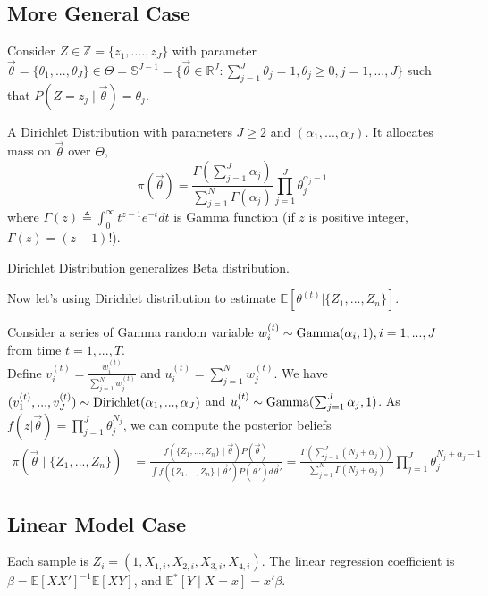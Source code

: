 \documentclass[11pt]{elegantbook}
\begin{document}
\subsection{More General Case}
Consider $Z\in \mathbb{Z}=\{z_1,....,z_J\}$ with parameter $\vec{\theta}=\{\theta_1,...,\theta_J\}\in \Theta= \mathbb{S}^{J-1}=\{\vec{\theta}\in \mathbb{R}^J:\sum_{j=1}^J\theta_j=1,\theta_j\geq 0, j=1,...,J\}$ such that $P(Z=z_j\mid\vec{\theta})=\theta_j$.
\begin{definition}
    \normalfont
    A Dirichlet Distribution with parameters $J\geq 2$ and $(\alpha_1,...,\alpha_J)$.
    It allocates mass on $\vec{\theta}$ over $\Theta$,
    $$\pi(\vec{\theta})=\frac{\Gamma(\sum_{j=1}^J \alpha_j)}{\sum_{j=1}^N\Gamma(\alpha_j)}\prod_{j=1}^J\theta_j^{\alpha_j-1}$$
    where $\Gamma(z)\triangleq\int_0^\infty t^{z-1}e^{-t}dt$ is Gamma function (if $z$ is positive integer, $\Gamma(z)=(z-1)!$).
\end{definition}
\begin{note}
    Dirichlet Distribution generalizes Beta distribution.
\end{note}

Now let's using Dirichlet distribution to estimate $\mathbb{E}[\theta^{(t)}|\{Z_1,...,Z_n\}]$.

Consider a series of Gamma random variable $w_i^{(t)}\sim \textnormal{Gamma}(\alpha_i,1), i=1,...,J$ from time $t=1,...,T$.\\
Define $v_i^{(t)}=\frac{w_i^{(t)}}{\sum_{j=1}^N w_j^{(t)}}$ and $u_i^{(t)}=\sum_{j=1}^N w_j^{(t)}$. We have $(v_1^{(t)},...,v_J^{(t)})\sim \textnormal{Dirichlet}(\alpha_1,...,\alpha_J)$ and $u_i^{(t)}\sim \textnormal{Gamma}(\sum_{j=1}^J\alpha_j,1)$. As $f(z|\vec{\theta})=\prod_{j=1}^J\theta_j^{N_j}$, we can compute the posterior beliefs
\begin{equation}
    \begin{aligned}
        \pi(\vec{\theta}\mid \{Z_1,...,Z_n\})&=\frac{f(\{Z_1,...,Z_n\}\mid \vec{\theta})P(\vec{\theta})}{\int f(\{Z_1,...,Z_n\}\mid \vec{\theta}')P(\vec{\theta}')d\vec{\theta}'}=\frac{\Gamma(\sum_{j=1}^J (N_j+\alpha_j))}{\sum_{j=1}^N\Gamma(N_j+\alpha_j)}\prod_{j=1}^J\theta_j^{N_j+\alpha_j-1}
    \end{aligned}
    \nonumber
\end{equation}

\subsection{Linear Model Case}
Each sample is $Z_i=(1,X_{1,i},X_{2,i},X_{3,i},X_{4,i})$. The linear regression coefficient is $\beta=\mathbb{E}[XX']^{-1}\mathbb{E}[XY]$, and $\mathbb{E}^*[Y\mid X=x]=x'\beta$.
\end{document}
